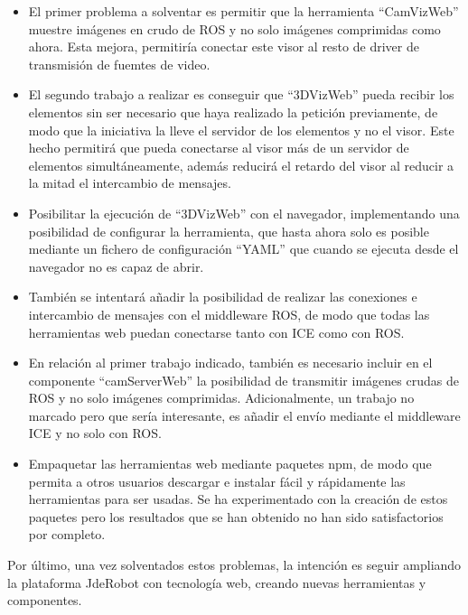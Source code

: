 \begin{itemize}
\item El primer problema a solventar es permitir que la herramienta ``CamVizWeb'' muestre imágenes en crudo de ROS y no solo imágenes comprimidas como ahora. Esta mejora, permitiría conectar este visor al resto de driver de transmisión de fuemtes de video.
\item El segundo trabajo a realizar es conseguir que ``3DVizWeb'' pueda recibir los elementos sin ser necesario que haya realizado la petición previamente, de modo que la iniciativa la lleve el servidor de los elementos y no el visor. Este hecho permitirá que pueda conectarse al visor más de un servidor de elementos simultáneamente, además reducirá el retardo del visor al reducir a la mitad el intercambio de mensajes.
\item Posibilitar la ejecución de ``3DVizWeb'' con el navegador, implementando una posibilidad de configurar la herramienta, que hasta ahora solo es posible mediante un fichero de configuración ``YAML'' que cuando se ejecuta desde el navegador no es capaz de abrir.
\item También se intentará añadir la posibilidad de realizar las conexiones e intercambio de mensajes con el middleware ROS, de modo que todas las herramientas web puedan conectarse tanto con ICE como con ROS.
\item En relación al primer trabajo indicado, también es necesario incluir en el componente ``camServerWeb'' la posibilidad de transmitir imágenes crudas de ROS y no solo imágenes comprimidas. Adicionalmente, un trabajo no marcado pero que sería interesante, es añadir el envío mediante el middleware ICE y no solo con ROS.
\item Empaquetar las herramientas web mediante paquetes npm, de modo que permita a otros usuarios descargar e instalar fácil y rápidamente las herramientas para ser usadas. Se ha experimentado con la creación de estos paquetes pero los resultados que se han obtenido no han sido satisfactorios por completo.
\end{itemize}

Por último, una vez solventados estos problemas, la intención es seguir ampliando la plataforma JdeRobot con tecnología web, creando nuevas herramientas y componentes.


